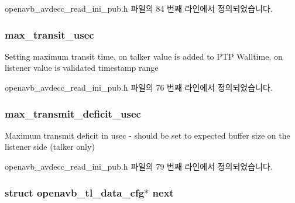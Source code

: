 openavb\+\_\+avdecc\+\_\+read\+\_\+ini\+\_\+pub.\+h 파일의 84 번째 라인에서 정의되었습니다.

\subsubsection[{\texorpdfstring{max\+\_\+transit\+\_\+usec}{max_transit_usec}}]{ max\+\_\+transit\+\_\+usec}\hypertarget{structopenavb__tl__data__cfg_a0980bddad549fb206164677f8095d44b}{}\label{structopenavb__tl__data__cfg_a0980bddad549fb206164677f8095d44b}
Setting maximum transit time, on talker value is added to P\+TP Walltime, on listener value is validated timestamp range 

openavb\+\_\+avdecc\+\_\+read\+\_\+ini\+\_\+pub.\+h 파일의 76 번째 라인에서 정의되었습니다.

\subsubsection[{\texorpdfstring{max\+\_\+transmit\+\_\+deficit\+\_\+usec}{max_transmit_deficit_usec}}]{ max\+\_\+transmit\+\_\+deficit\+\_\+usec}\hypertarget{structopenavb__tl__data__cfg_adca8d3921ed9e2b689df1e37ffaf1a3d}{}\label{structopenavb__tl__data__cfg_adca8d3921ed9e2b689df1e37ffaf1a3d}
Maximum transmit deficit in usec -\/ should be set to expected buffer size on the listener side (talker only) 

openavb\+\_\+avdecc\+\_\+read\+\_\+ini\+\_\+pub.\+h 파일의 79 번째 라인에서 정의되었습니다.

\subsubsection[{\texorpdfstring{next}{next}}]{\setlength{\rightskip}{0pt plus 5cm}struct {\bf openavb\+\_\+tl\+\_\+data\+\_\+cfg}$\ast$ next}\hypertarget{structopenavb__tl__data__cfg_a46f524e45db4fe7e0158366e4e8e6b5a}{}\label{structopenavb__tl__data__cfg_a46f524e45db4fe7e0158366e4e8e6b5a}


